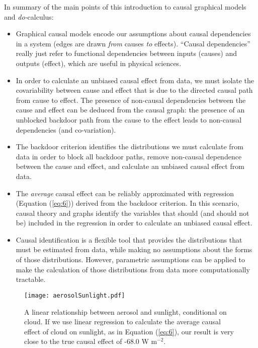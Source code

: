 \documentclass[12pt]{article}
\begin{document}
In summary of the main points of this introduction to causal graphical
models and \textit{do-}calculus:

\begin{itemize}
\item Graphical causal models encode our assumptions about causal
  dependencies in a system (edges are drawn \emph{from} causes
  \emph{to} effects). ``Causal dependencies'' really just refer to
  functional dependencies between inputs (causes) and outputs
  (effect), which are useful in physical sciences.
\item In order to calculate an unbiased causal effect from data, we
  must isolate the covariability between cause and effect that is due
  to the directed causal path from cause to effect. The presence of
  non-causal dependencies between the cause and effect can be deduced
  from the causal graph: the presence of an unblocked backdoor path
  from the cause to the effect leads to non-causal dependencies (and
  co-variation).
\item The backdoor criterion identifies the distributions we must
  calculate from data in order to block all backdoor paths, remove
  non-causal dependence between the cause and effect, and calculate an
  unbiased causal effect from data.
\item The \emph{average} causal effect can be reliably approximated
  with regression (Equation (\ref{eq:6})) derived from the backdoor
  criterion. In this scenario, causal theory and graphs identify the
  variables that should (and should not be) included in the regression
  in order to calculate an unbiased causal effect.
\item Causal identification is a flexible tool that provides the
  distributions that must be estimated from data, while making no
  assumptions about the forms of those distributions. However,
  parametric assumptions can be applied to make the calculation of
  those distributions from data more computationally tractable.
\end{itemize}

\begin{figure}
  \texttt{[image: aerosolSunlight.pdf]}
  \caption{A linear relationship between aerosol and sunlight,
    conditional on cloud. If we use linear regression to calculate the
    average causal effect of cloud on sunlight, as in Equation
    (\ref{eq:6}), our result is very close to the true causal effect
    of -68.0 W m$^{-2}$.}
  \label{fig:linear}
\end{figure}
\end{document}

